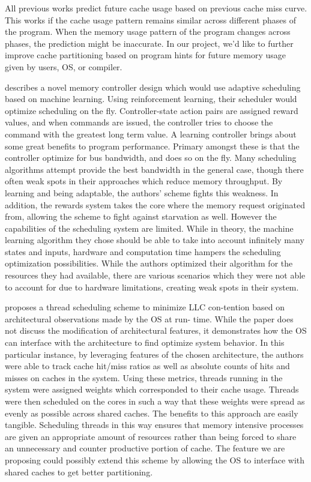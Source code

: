\documentclass{acm_proc_article-sp}
\begin{document}
All previous works predict future cache usage based on previous cache miss 
curve. This works if the cache usage pattern remains similar across different 
phases of the program. When the memory usage pattern of the program changes 
across phases, the prediction might be inaccurate. In our project, we'd like to
further improve cache partitioning based on program hints for future memory 
usage given by users, OS, or compiler.

\cite{Ipek:2008:SMC:1381306.1382172} describes a novel memory controller design
 which would use adaptive 
scheduling based on machine learning. Using reinforcement learning, their 
scheduler would optimize scheduling on the fly. Controller-state action pairs 
are assigned reward values, and when commands are issued, the controller tries 
to choose the command with the greatest long term value. A learning controller 
brings about some great benefits to program performance. Primary amongst these 
is that the controller optimize for bus bandwidth, and does so on the fly. Many 
scheduling algorithms attempt provide the best bandwidth in the general case, 
though there often weak spots in their approaches which reduce memory 
throughput. By learning and being adaptable, the authors’ scheme fights this 
weakness. In addition, the rewards system takes the core where the memory 
request originated from, allowing the scheme to fight against starvation as 
well. However the capabilities of the scheduling system are limited. While in 
theory, the machine learning algorithm they chose should be able to take into 
account infinitely many states and inputs, hardware and computation time hampers
 the scheduling optimization possibilities. While the authors optimized their 
algorithm for the resources they had available, there are various scenarios 
which they were not able to account for due to hardware limitations, creating 
weak spots in their system.

\cite{10.1109/MM.2008.48} proposes a thread scheduling scheme to minimize LLC 
con-tention based on 
architectural observations made by the OS at run- time. While the paper does 
not discuss the modification of architectural features, it demonstrates how the 
OS can interface with the architecture to find optimize system behavior. In this
 particular instance, by leveraging features of the chosen architecture, the 
authors were able to track cache hit/miss ratios as well as absolute counts of 
hits and misses on caches in the system. Using these metrics, threads running in
 the system were assigned weights which corresponded to their cache usage. 
Threads were then scheduled on the cores in such a way that these weights were 
spread as evenly as possible across shared caches. The benefits to this approach
 are easily tangible. Scheduling threads in this way ensures that memory 
intensive processes are given an appropriate amount of resources rather than 
being forced to share an unnecessary and counter productive portion of cache. 
The feature we are proposing could possibly extend this scheme by allowing the 
OS to interface with shared caches to get better partitioning.
\end{document}
